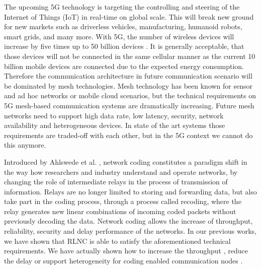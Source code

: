 %

The upcoming 5G technology is targeting the controlling and steering of the Internet of Things (IoT) in real-time on global scale. This will break new ground for new markets such as driverless vehicles, manufacturing, humanoid robots, smart grids, and many more. With 5G, the number of wireless devices will increase by five times up to 50 billion devices \cite{cisco2011forecast}. It is generally acceptable, that those devices will not be connected in the same cellular manner as the current 10 billion mobile devices are connected due to the expected energy consumption. Therefore the communication architecture in future communication scenario will be dominated by mesh technologies. Mesh technology has been known for sensor and ad hoc networks or mobile cloud scenarios, but the technical requirements on 5G mesh-based communication systems are dramatically increasing. Future mesh networks need to support high data rate, low latency, security, network availability and heterogeneous devices. In state of the art systems those requirements are traded-off with each other, but in the 5G context we cannot do this anymore.

Introduced by Ahlswede et al. \cite{ahlswede2000network}, network coding constitutes a paradigm shift in the way how researchers and industry understand and operate networks, by changing the role of intermediate relays in the process of transmission of information. Relays are no longer limited to storing and forwarding data, but also take part in the coding process, through a process called recoding, where the relay generates new linear combinations of incoming coded packets without previously decoding the data. Network coding allows the increase of throughput, reliability, security and delay performance of the networks. In our previous works, we have shown that \ac{RLNC} \cite{koetter2003algebraic,ho2006random} is able to satisfy the aforementioned technical requirements. We have actually shown how to increase the throughput \cite{pahlevani2013playncool}, reduce the delay \cite{szabo2015towards} or support heterogeneity for coding enabled communication nodes \cite{lucani2014fulcrum}.

